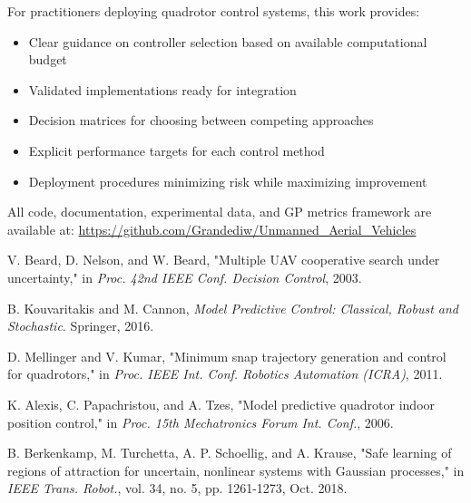\documentclass[journal]{IEEEtran}
\begin{document}
For practitioners deploying quadrotor control systems, this work provides:
\begin{itemize}
    \item Clear guidance on controller selection based on available computational budget
    \item Validated implementations ready for integration
    \item Decision matrices for choosing between competing approaches
    \item Explicit performance targets for each control method
    \item Deployment procedures minimizing risk while maximizing improvement
\end{itemize}

All code, documentation, experimental data, and GP metrics framework are available at: \url{https://github.com/Grandediw/Unmanned_Aerial_Vehicles}

\begin{thebibliography}{99}

V. Beard, D. Nelson, and W. Beard, "Multiple UAV cooperative search under uncertainty," in \textit{Proc. 42nd IEEE Conf. Decision Control}, 2003.

B. Kouvaritakis and M. Cannon, \textit{Model Predictive Control: Classical, Robust and Stochastic}. Springer, 2016.

D. Mellinger and V. Kumar, "Minimum snap trajectory generation and control for quadrotors," in \textit{Proc. IEEE Int. Conf. Robotics Automation (ICRA)}, 2011.

K. Alexis, C. Papachristou, and A. Tzes, "Model predictive quadrotor indoor position control," in \textit{Proc. 15th Mechatronics Forum Int. Conf.}, 2006.

B. Berkenkamp, M. Turchetta, A. P. Schoellig, and A. Krause, "Safe learning of regions of attraction for uncertain, nonlinear systems with Gaussian processes," in \textit{IEEE Trans. Robot.}, vol. 34, no. 5, pp. 1261-1273, Oct. 2018.

\end{thebibliography}
\end{document}
